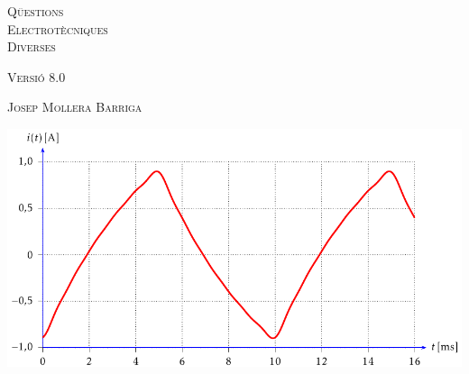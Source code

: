 \begin{titlepage}

   \parbox{18cm}{\fontsize{60pt}{60pt}\selectfont\color{NavyBlue}\scshape%
                 Q\"{u}estions\\[30pt] Electrot\`{e}cniques\\[30pt] Diverses}

   \vspace*{1.8cm}
   {\fontsize{30pt}{30pt}\selectfont\textsc{Versi\'{o} 8.0}}

   \vspace*{1.5cm}
   {\fontsize{40pt}{40pt}\selectfont\textsc{Josep Mollera Barriga}}

   \vspace*{1cm}
   \centering
   \includegraphics{Imatges/Cap-Fourier-Exemple-Corrent.pdf}

\end{titlepage}
